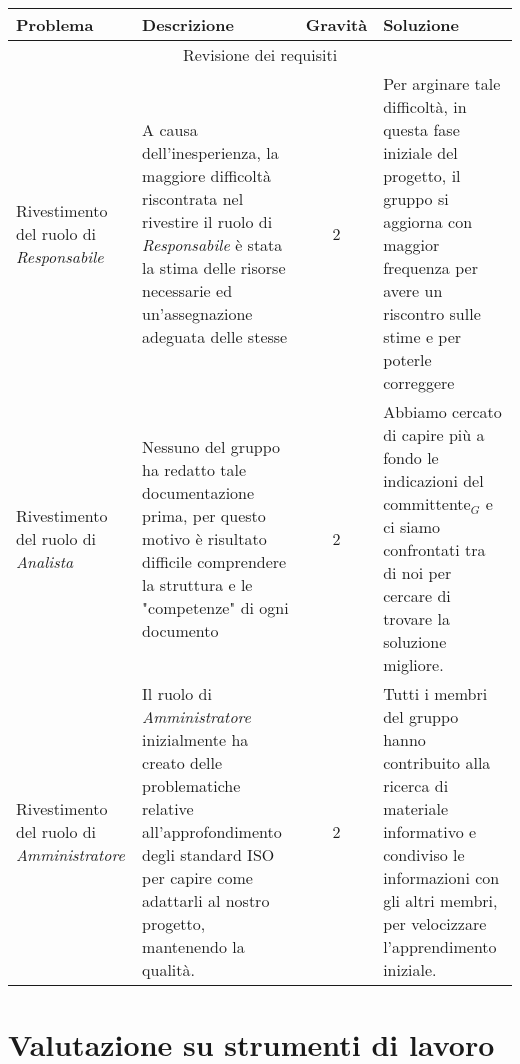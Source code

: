 {{\quad
\def\tabularxcolumn#1{m{#1}}
{
	
	\begin{center}
		\renewcommand{\arraystretch}{1.4}
		\begin{tabularx}{\textwidth}{|X|X|c|X|}
			\hline
			\rowcolor{airforceblue}
			\textbf{Problema} & \textbf{Descrizione} & \textbf{Gravità} & \textbf{Soluzione}\\
			\hline
			\multicolumn{4}{|c|}{Revisione dei requisiti}\\
			Rivestimento del ruolo di \textit{Responsabile} &A causa dell'inesperienza, la maggiore difficoltà riscontrata nel rivestire il ruolo di \textit{Responsabile} è stata la stima delle risorse necessarie ed un'assegnazione adeguata delle stesse & 2 & Per arginare tale difficoltà,  in questa fase iniziale del progetto, il gruppo si aggiorna con maggior frequenza per avere un riscontro sulle stime e per poterle correggere \\
			\hline
			Rivestimento del ruolo di \textit{Analista}& Nessuno del gruppo ha redatto tale documentazione prima, per questo motivo è risultato difficile comprendere la struttura e le "competenze" di ogni documento & 2 & Abbiamo cercato di capire più a fondo le indicazioni del committente$_G$ e ci siamo confrontati tra di noi per cercare di trovare la soluzione migliore. \\
			\hline
			Rivestimento del ruolo di \textit{Amministratore} & Il ruolo di \textit{Amministratore} inizialmente ha creato delle problematiche relative all'approfondimento degli standard ISO per capire come adattarli al nostro progetto, mantenendo la qualità. & 2 & Tutti i membri del gruppo hanno contribuito alla ricerca di materiale informativo e condiviso le informazioni con gli altri membri, per velocizzare l'apprendimento iniziale. \\
			\hline
		\end{tabularx}
	\end{center}
\clearpage

\section{Valutazione su strumenti di lavoro}  \label{ValutazionePerIlMiglioramentoValutazioneSuStrumentiDiLavoro}

\quad
\def\tabularxcolumn#1{m{#1}}
{
	
}}}}
